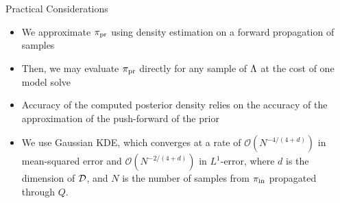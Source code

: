 \begin{frame}[t]{Practical Considerations}

\begin{itemize}
	\item <1-> We approximate $\operatorname*{\pi_{pr}}$ using density estimation on a forward propagation of samples
	\item <2-> Then, we may evaluate $\operatorname*{\pi_{pr}}$ directly for any sample of ${\Lambda}$ at the cost of one model solve
	\item <3-> Accuracy of the computed posterior density relies on the accuracy of the approximation of the push-forward of the prior
	\item <4-> We use Gaussian KDE, which converges at a rate of $\mathcal{O}(N^{-4/(4+d)})$ in mean-squared error and $\mathcal{O}(N^{-2/(4+d)})$ in $L^1$-error, where $d$ is the dimension of $\mathcal{D}$, and $N$ is the number of samples from $\operatorname*{\pi_{in}}$ propagated through $Q$.

\end{itemize}
\end{frame}
